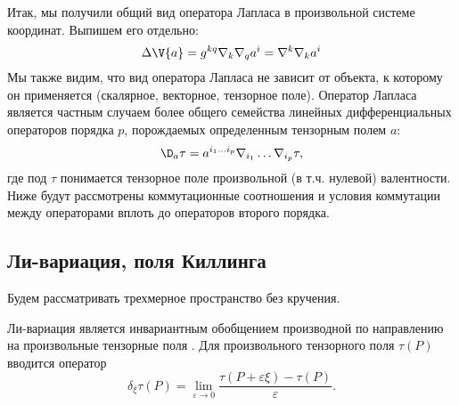     Итак, мы получили общий вид оператора Лапласа в произвольной системе координат. Выпишем его отдельно:
    \begin{equation}
        \Delta{\V{a}} = g^{kq} \nabla_k \nabla_{q} a^i
                        = \nabla^k \nabla_k a^i
    \end{equation}
    Мы также видим, что вид оператора Лапласа не зависит от объекта, к которому он применяется (скалярное, векторное, тензорное поле). Оператор Лапласа является частным случаем более общего семейства линейных дифференциальных операторов порядка $p$, порождаемых определенным тензорным полем $a$:
    \begin{equation}
        \D_a\tau = a^{i_1 \dots i_p} \nabla_{i_1} \dots \nabla_{i_p} \tau ,
    \end{equation}
    где под $\tau$ понимается тензорное поле произвольной (в т.ч. нулевой) валентности. Ниже будут рассмотрены коммутационные соотношения и условия коммутации между операторами вплоть до операторов второго порядка.

%
%
%
%
%
%

\subsection{Ли-вариация, поля Киллинга}

    Будем рассматривать трехмерное пространство без кручения\footnotemark{}.


    Ли-вариация является инвариантным обобщением производной по направлению на произвольные тензорные поля \cite{lie_derivative_theory,symmetry_and_killing_fields}. Для произвольного тензорного поля $\tau(P)$ вводится оператор
    \begin{equation}
        \delta_\xi \tau(P) = \lim\limits_{\varepsilon \to 0} \frac{
            \tau(P + \varepsilon \xi) - \tau(P)
        }{\varepsilon}.
    \end{equation}

